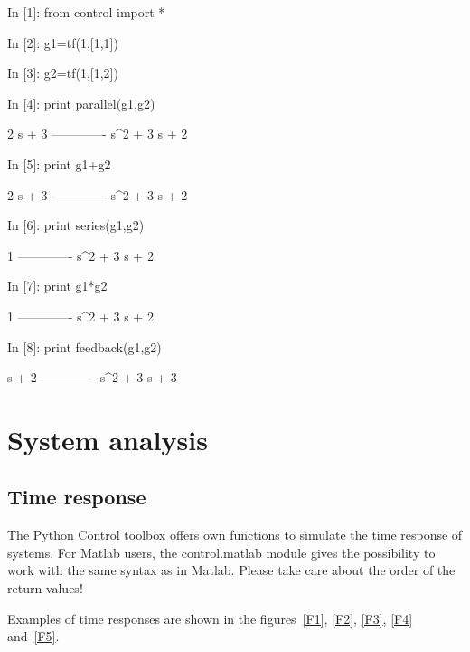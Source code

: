 \begin{code}
In [1]: from control import *

In [2]: g1=tf(1,[1,1])

In [3]: g2=tf(1,[1,2])

In [4]: print parallel(g1,g2)

   2 s + 3
-------------
s^2 + 3 s + 2


In [5]: print g1+g2

   2 s + 3
-------------
s^2 + 3 s + 2
\end{code}

\begin{code}
In [6]: print series(g1,g2)

      1
-------------
s^2 + 3 s + 2


In [7]: print g1*g2

      1
-------------
s^2 + 3 s + 2
\end{code}

\begin{code}
In [8]: print feedback(g1,g2)

    s + 2
-------------
s^2 + 3 s + 3
\end{code}

\chapter{System analysis}

\section{Time response}

The Python Control toolbox offers own functions to simulate the time 
response of systems. For Matlab users, the control.matlab module gives the 
possibility to work with the same syntax as in Matlab.
Please take care about the order of the return values!

Examples of time responses are shown in the figures~\ref{F1}, \ref{F2}, 
\ref{F3}, \ref{F4} and~\ref{F5}.

